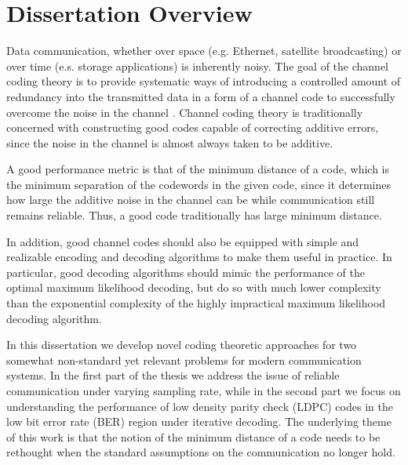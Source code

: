 \chapter[Dissertation Overview]{Dissertation Overview}

Data communication, whether over space (e.g. Ethernet, satellite
broadcasting) or over time (e.s. storage applications) is inherently
noisy. The goal of the channel coding theory is to provide
systematic ways of introducing a controlled amount of redundancy
into the transmitted data in a form of a channel code to
successfully overcome the noise in the channel \cite{wicker}.
Channel coding theory is traditionally concerned with constructing
good codes capable of correcting additive errors, since the noise in
the channel is almost always taken to be additive.

A good performance metric is that of the minimum distance of a code,
which is the minimum separation of the codewords in the given code,
since it determines how large the additive noise in the channel can
be while communication still remains reliable. Thus, a good code
traditionally has large minimum distance.

In addition, good channel codes should also be equipped with simple
and realizable encoding and decoding algorithms to make them useful
in practice. In particular, good decoding algorithms should mimic
the performance of the optimal maximum likelihood decoding, but do
so with much lower complexity than the exponential complexity of the
highly impractical maximum likelihood decoding algorithm. %

 In this dissertation we
develop novel coding theoretic approaches for two somewhat
non-standard yet relevant problems for modern communication systems.
In the first part of the thesis we address the issue of reliable
communication under varying sampling rate, while in the second part
we focus on understanding the performance of low density parity
check (LDPC) codes in the low bit error rate (BER) region under
iterative decoding. The underlying theme of this work is that the
notion of the minimum distance of a code needs to be rethought when
the standard assumptions on the communication no longer hold.

